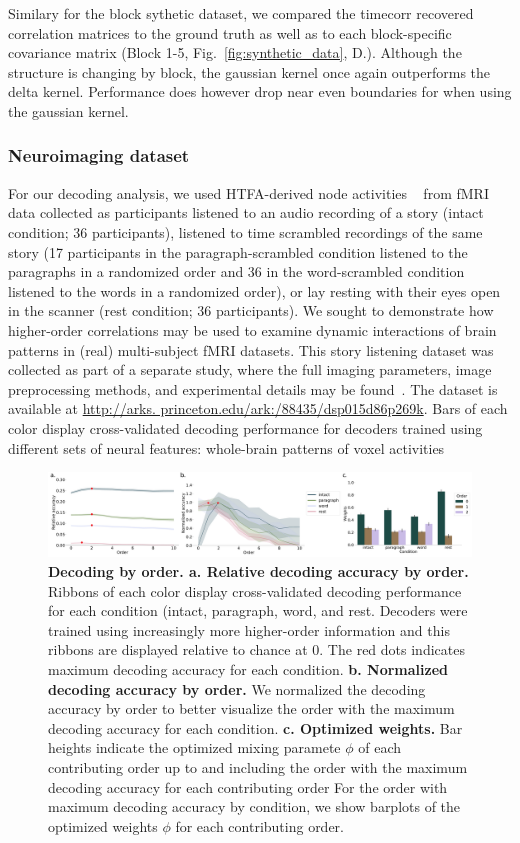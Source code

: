 \documentclass[english]{article}
\begin{document}
Similary for the block sythetic dataset, we compared the timecorr
recovered correlation matrices to the ground truth as well as to each
block-specific covariance matrix (Block 1-5,
Fig.~\ref{fig:synthetic_data},  D.).  Although the structure is
changing by block, the gaussian kernel once again outperforms the
delta kernel.  Performance does however drop near even boundaries for
when using the gaussian kernel. 


\subsubsection*{Neuroimaging dataset~\citep{SimoEtal16}}
For our decoding analysis, we used HTFA-derived node activities
~\cite{MannEtal18} from fMRI data collected as participants listened
to an audio recording of a story (intact condition; 36 participants),
listened to time scrambled recordings of the same story (17
participants in the paragraph-scrambled condition listened to the
paragraphs in a randomized order and 36 in the word-scrambled
condition listened to the words in a randomized order), or lay resting
with their eyes open in the scanner (rest condition; 36
participants). We sought to demonstrate how higher-order correlations
may be used to examine dynamic interactions of brain patterns in
(real) multi-subject fMRI datasets. This story listening dataset was
collected as part of a separate study, where the full imaging
parameters, image preprocessing methods, and experimental details may
be found~\citep{SimoEtal16}. The dataset is available at
\href{url}{http://arks. princeton.edu/ark:/88435/dsp015d86p269k}.
Bars of each color display cross-validated decoding performance for decoders trained using different sets of neural features: whole-brain patterns of voxel activities
\begin{figure}
  \centering
  \includegraphics[width=\textwidth]{figs/decode_level.pdf}
  \caption{\textbf{Decoding by order.
      a. Relative decoding accuracy by order.} Ribbons of each
    color display cross-validated decoding performance for each condition (intact, paragraph, word,
    and rest. Decoders were trained using increasingly more
    higher-order information and this ribbons are displayed relative
    to chance at 0. The red dots indicates
    maximum decoding accuracy for each condition. \textbf{b. Normalized decoding accuracy
      by order.}  We normalized the decoding accuracy by order to better
    visualize the order with the maximum decoding accuracy for each
    condition. \textbf{c. Optimized weights.} Bar heights indicate the
    optimized mixing paramete $\phi$ of each contributing order up to
    and including the order with the maximum
    decoding accuracy for each contributing order
  For the order with maximum decoding accuracy by condition, we show
  barplots of the optimized weights $\phi$  for each contributing
  order.}
  \label{fig:decoding_level}
\end{figure}
\end{document}
